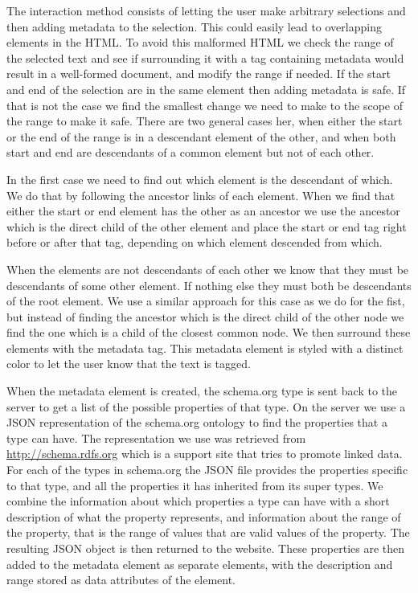 The interaction method consists of letting the user make arbitrary selections and then adding metadata to the selection.
This could easily lead to overlapping elements in the HTML.
To avoid this malformed HTML we check the range of the selected text and see if surrounding it with a tag
containing metadata would result in a well-formed document, and modify the range if needed.
If the start and end of the selection are in the same element then adding metadata is safe.
If that is not the case we find the smallest change we need to make to the scope of the range to make it safe.
There are two general cases her, when either the start or the end of the range is in a descendant element of the other,
and when both start and end are descendants of a common element but not of each other.

In the first case we need to find out which element is the descendant of which.
We do that by following the ancestor links of each element.
When we find that either the start or end element has the other as an ancestor we use the ancestor which is the direct
child of the other element and place the start or end tag right before or after that tag, depending on which element
descended from which.

When the elements are not descendants of each other we know that they must be descendants of some other element.
If nothing else they must both be descendants of the root element.
We use a similar approach for this case as we do for the fist,
but instead of finding the ancestor which is the direct child of the other node we find the one which is a child of the
closest common node.
We then surround these elements with the metadata tag.
This metadata element is styled with a distinct color to let the user know that the text is tagged.

When the metadata element is created,
the schema.org type is sent back to the server to get a list of the possible properties of that type.
On the server we use a JSON representation of the schema.org ontology to find the properties that a type can have.
The representation we use was retrieved from \url{http://schema.rdfs.org} which is a support site that tries to
promote linked data.
For each of the types in schema.org the JSON file provides the properties specific to that type,
and all the properties it has inherited from its super types.
We combine the information about which properties a type can have with a short description of what the property represents,
and information about the range of the property, that is the range of values that are valid values of the property.
The resulting JSON object is then returned to the website.
These properties are then added to the metadata element as separate elements,
with the description and range stored as data attributes of the element.

